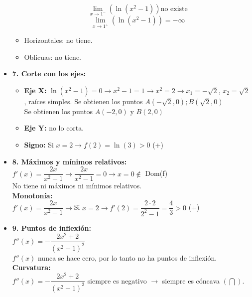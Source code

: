 \begin{itemize}
\begin{itemize}
		$$\lim_{x \to 1^{-}}(\ln (x^2-1)) \text{no existe}$$
		$$\lim_{x \to 1^{+}}(\ln (x^2-1))=-\infty$$
		\item Horizontales: no tiene.
		\item Oblicuas: no tiene.
	\end{itemize}
	\item \textbf{7. Corte con los ejes: }
	\begin{itemize}
		\item \textbf{Eje X: }$\ln(x^2-1) = 0 \rightarrow x^2-1=1 \rightarrow x^2=2 \rightarrow x_1=-\sqrt{2}$, $x_2=\sqrt{2}$, raíces simples. Se obtienen los puntos $A(-\sqrt{2},0); B(\sqrt{2},0)$\\
		Se obtienen los puntos $A(-2, 0)$ y $B(2,0)$
		\item \textbf{Eje Y: }no lo corta.
		\item \textbf{Signo: }Si $x=2 \rightarrow f(2)=\ln(3)>0$ (+)
	\end{itemize}
	\item \textbf{8. Máximos y mínimos relativos: }\\
	$f'(x)=\dfrac{2x}{x^2-1} \rightarrow \dfrac{2x}{x^2-1} = 0 \rightarrow x=0 \notin$ Dom(f)\\
	No tiene ni máximos ni mínimos relativos.\\
	\textbf{Monotonía: }\\
	$f'(x) = \dfrac{2x}{x^2-1} \rightarrow $Si $x=2 \rightarrow f'(2)=\dfrac{2\cdot 2}{2^2-1} = \dfrac{4}{3}>0$ (+)
	\item \textbf{9. Puntos de inflexión: }\\
	$f''(x)=-\dfrac{2x^2+2}{(x^2-1)^{2}}$ \\
	$f''(x)$ nunca se hace cero, por lo tanto no ha puntos de inflexión.\\
	\textbf{Curvatura: }\\
	$f''(x)=-\dfrac{2x^2+2}{(x^2-1)^{2}}$ siempre es negativo $\rightarrow$ siempre es cóncava $(\bigcap)$.	
\end{itemize}
